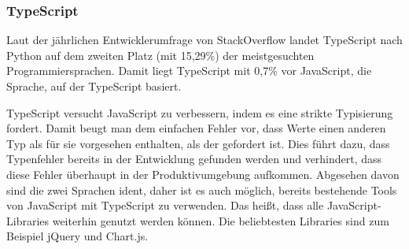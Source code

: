\subsubsection{TypeScript}

Laut der jährlichen Entwicklerumfrage von StackOverflow landet TypeScript nach Python auf dem zweiten Platz (mit 15,29\%) der meistgesuchten Programmiersprachen. Damit liegt TypeScript mit 0,7\% vor JavaScript, die Sprache, auf der TypeScript basiert. \cite{SFT}

TypeScript versucht JavaScript zu verbessern, indem es eine strikte Typisierung fordert. Damit beugt man dem einfachen Fehler vor, dass Werte einen anderen Typ als für sie vorgesehen enthalten, als der gefordert ist. Dies führt dazu, dass Typenfehler bereits in der Entwicklung gefunden werden und verhindert, dass diese Fehler überhaupt in der Produktivumgebung aufkommen. Abgesehen davon sind die zwei Sprachen ident, daher ist es auch möglich, bereits bestehende Tools von JavaScript mit TypeScript zu verwenden. Das heißt, dass alle JavaScript-Libraries weiterhin genutzt werden können. Die beliebtesten Libraries sind zum Beispiel jQuery und Chart.js. \cite{TS}
